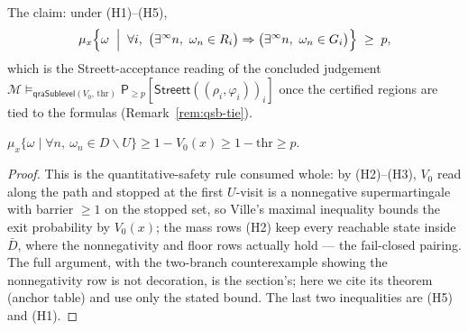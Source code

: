 The claim: under (H1)--(H5),
\[
\mu_x\Bigl\{\omega \;\Bigm|\; \forall i,\ \bigl(\exists^\infty n,\ \omega_n
\in R_i\bigr) \Rightarrow \bigl(\exists^\infty n,\ \omega_n \in G_i\bigr)
\Bigr\} \;\ge\; p ,
\]
which is the Streett-acceptance reading of the concluded judgement
$\mathcal{M} \vDash_{\mathsf{qraSublevel}(V_0,\,\mathrm{thr})}
\mathsf{P}_{\ge p}[\mathsf{Streett}((\rho_i, \varphi_i))_i]$ once the
certified regions are tied to the formulas (Remark~\ref{rem:qsb-tie}).

\begin{blemma}[confinement]\label{lem:qsb-confine}
$\mu_x\{\omega \mid \forall n,\ \omega_n \in D \smallsetminus U\} \ge
1 - V_0(x) \ge 1 - \mathrm{thr} \ge p$.
\end{blemma}
\begin{proof}
This is the quantitative-safety rule consumed whole: by (H2)--(H3), $V_0$
read along the path and stopped at the first $U$-visit is a nonnegative
supermartingale with barrier $\ge 1$ on the stopped set, so Ville's maximal
inequality bounds the exit probability by $V_0(x)$; the mass rows (H2) keep
every reachable state inside $\bar{D}$, where the nonnegativity and floor
rows actually hold --- the fail-closed pairing. The full argument, with the
two-branch counterexample showing the nonnegativity row is not decoration,
is the  section's; here we cite its theorem
(anchor table) and use only the stated bound. The last two inequalities are
(H5) and (H1).
\end{proof}

